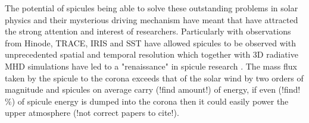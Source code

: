 \documentclass[12pt]{ociamthesis}
\begin{document}
\par The potential of spicules being able to solve these outstanding problems in solar physics and their mysterious driving mechanism have meant that have attracted the strong attention and interest of researchers. Particularly with observations from Hinode, TRACE, IRIS and SST have allowed spicules to be observed with unprecedented spatial and temporal resolution which together with 3D radiative MHD simulations have led to a "renaissance" in spicule research \citep{Aschwanden2019ASSL}. The mass flux taken by the spicule to the corona exceeds that of the solar wind by two orders of magnitude \citep{Thomas1961} and spicules on average carry (!find amount!) of energy, if even (!find! \%) of spicule energy is dumped into the corona then it could easily power the upper atmosphere \citep{Woltjer1954BAN,Rush1954AuJPh,Li2009RAA} (!not correct papers to cite!). 
\end{document}
